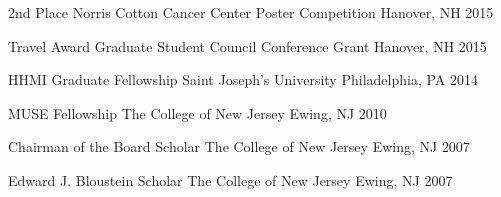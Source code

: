 \begin{cvhonors}

  \cvhonor
    {2nd Place} %
    {Norris Cotton Cancer Center Poster Competition} %
    {Hanover, NH} %
    {2015} %

  \cvhonor
    {Travel Award} %
    {Graduate Student Council Conference Grant} %
    {Hanover, NH} %
    {2015} %

\end{cvhonors}


\begin{cvhonors}

  \cvhonor
    {HHMI Graduate Fellowship} %
    {Saint Joseph's University} %
    {Philadelphia, PA} %
    {2014} %

  \cvhonor
    {MUSE Fellowship} %
    {The College of New Jersey} %
    {Ewing, NJ} %
    {2010} %

  \cvhonor
    {Chairman of the Board Scholar} %
    {The College of New Jersey} %
    {Ewing, NJ} %
    {2007} %

  \cvhonor
    {Edward J. Bloustein Scholar} %
    {The College of New Jersey} %
    {Ewing, NJ} %
    {2007} %

\end{cvhonors}
